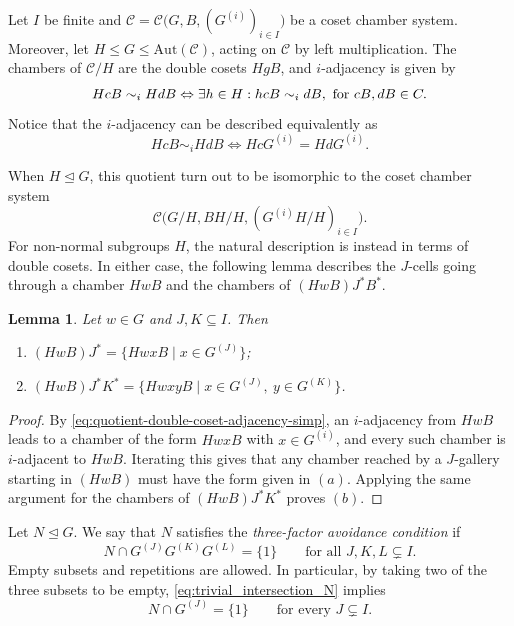 \documentclass[11pt,letterpaper]{amsart}
\newtheorem{lemma}[prop]{Lemma}
\newcommand{\CC}{\mathcal{C}}
\newcommand{\Aut}{\mathrm{Aut}}
\begin{document}
Let $I$ be finite and $\CC=\CC\bigl(G,B,(G^{(i)})_{i\in I}\bigr)$ be a coset chamber system. Moreover, let $H\leq G\leq \Aut(\CC)$, acting on $\CC$ by left multiplication.  The chambers of
$\CC/H$ are the double cosets $HgB$, and $i$-adjacency is given by\begin{equation*}
HcB \sim_i HdB \Leftrightarrow \exists h\in H: hcB \sim_i dB,\ \textnormal{for }cB,dB\in C.\end{equation*}
Notice that the $i$-adjacency can be described equivalently as 
\begin{equation}
\label{eq:quotient-double-coset-adjacency-simp}HcB \sim_i HdB \Longleftrightarrow HcG^{(i)}=HdG^{(i)}.
\end{equation}

When $H\trianglelefteq G$, this quotient turn out to be isomorphic to the coset chamber system
\[\CC\bigl(G/H,BH/H,(G^{(i)}H/H)_{i\in I}\bigr).\]
For non-normal subgroups $H$, the natural description is instead in terms of double cosets. In either case, the following lemma describes the $J$-cells going through a chamber $HwB$ and the chambers of $(HwB)J^*B^*$.

\begin{lemma}
\label{lem:quotient-cell-description}
Let $w\in G$ and $J,K\subseteq I$.  Then
\begin{enumerate}
    \item $(HwB)J^* =\{HwxB\mid x\in G^{(J)}\}$;
    \item $(HwB)J^*K^* =\{HwxyB\mid x\in G^{(J)},\ y\in G^{(K)}\}$.
\end{enumerate}
\end{lemma}

\begin{proof}
By \eqref{eq:quotient-double-coset-adjacency-simp}, an $i$-adjacency from $HwB$
leads to a chamber of the form $HwxB$ with $x\in G^{(i)}$, and every such
chamber is $i$-adjacent to $HwB$.  Iterating this gives that any chamber reached by a $J$-gallery starting in $(HwB)$ must have the form given in $(a)$. Applying the same argument for the chambers of $(HwB)J^*K^*$ proves $(b)$.
\end{proof}

Let $N\trianglelefteq G$.  We say that $N$ satisfies the
\emph{three-factor avoidance condition} if
\begin{equation}
\label{eq:trivial_intersection_N}
    N\cap G^{(J)}G^{(K)}G^{(L)}=\{1\}
    \qquad\text{for all }J,K,L\subsetneq I.
\end{equation}
Empty subsets and repetitions are
allowed.  In particular, by taking two of the three subsets to be empty,
\eqref{eq:trivial_intersection_N} implies
\begin{equation}
\label{eq:one-factor-avoidance}
    N\cap G^{(J)}=\{1\}
    \qquad\text{for every }J\subsetneq I.
\end{equation}
\end{document}
